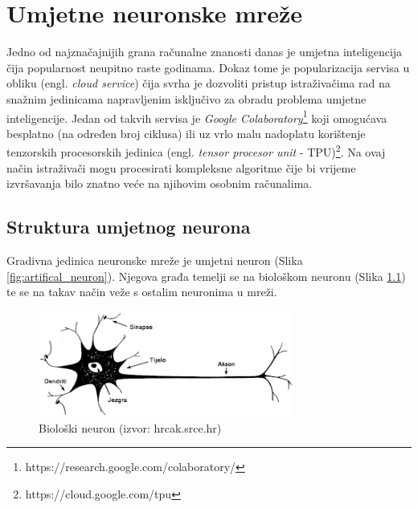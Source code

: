 \documentclass[times, utf8, zavrsni]{fer}
\begin{document}
\chapter{Umjetne neuronske mreže}
Jedno od najznačajnijih grana računalne znanosti danas je umjetna inteligencija čija popularnost neupitno raste godinama. Dokaz tome je popularizacija servisa u obliku (engl. \textit{cloud service}) čija svrha je dozvoliti pristup istraživačima rad na snažnim jedinicama napravljenim isključivo za obradu problema umjetne inteligencije. Jedan od takvih servisa je \textit{Google Colaboratory}\footnote{https://research.google.com/colaboratory/} koji omogućava besplatno (na određen broj ciklusa) ili uz vrlo malu nadoplatu korištenje tenzorskih procesorskih jedinica (engl. \textit{tensor procesor unit} - TPU)\footnote{https://cloud.google.com/tpu}. Na ovaj način istraživači mogu procesirati kompleksne algoritme čije bi vrijeme izvršavanja bilo znatno veće na njihovim osobnim računalima.




\noindent

\newpage
\section{Struktura umjetnog neurona}
Gradivna jedinica neuronske mreže je umjetni  neuron (Slika \ref{fig:artifical_neuron}). Njegova građa temelji se na biološkom neuronu (Slika \ref{fig:biological_neuron}) te se na takav način veže s ostalim neuronima u mreži.

\begin{figure}[htb!]
\centering
\includegraphics[width=0.75\textwidth]{biological_neuron.png}
\caption{Biološki neuron (izvor: hrcak.srce.hr)}
\label{fig:biological_neuron}
\end{figure}
\end{document}
